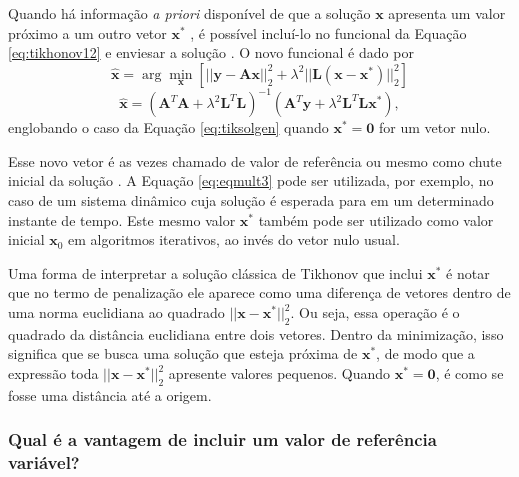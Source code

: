 Quando há informação \textit{a priori} disponível de que a solução $\mathbf{x}$ apresenta um valor próximo a um outro vetor $\mathbf{x}^*$ \cite[pág. 69]{Mueller2012}, é possível incluí-lo no funcional da Equação \eqref{eq:tikhonov12} e enviesar  a solução \cite[pág. 13]{Hansen1998}. O novo funcional é dado por \cite[pág. 33]{paivi}
\begin{equation}
\hat{\mathbf{x}} = \arg\min\limits_{\mathbf{x}} \left[ \vert \vert \mathbf{y}- \mathbf{A} \mathbf{x} \vert \vert^2_2 + \lambda^2 \vert \vert \mathbf{L} \left(\mathbf{x} - \mathbf{x}^*\right) \vert \vert^2_2 \right] 
\label{eq:eqmult33}
\end{equation}
 \begin{equation}
\hat{\mathbf{x}} =  \left( \mathbf{A}^T \mathbf{A} + \lambda^2 \mathbf{L}^T \mathbf{L} \right)^{-1} \left(\mathbf{A}^T \mathbf{y} + \lambda^2 \mathbf{L}^T \mathbf{L} \mathbf{x}^* \right),
\label{eq:eqmult3}
\end{equation}
englobando o caso da Equação \eqref{eq:tiksolgen} quando $\mathbf{x}^* = \mathbf{0}$ for um vetor nulo. 

Esse novo vetor é as vezes chamado de valor de referência  \cite[pág. 60]{Neto2005} ou mesmo como chute inicial da solução \cite[pág. 99]{Camargo2013}.  A Equação \eqref{eq:eqmult3} pode ser utilizada, por exemplo, no caso de um sistema dinâmico cuja solução é esperada para em um determinado instante de tempo. Este mesmo valor $\mathbf{x}^*$ também pode ser utilizado como valor inicial $\mathbf{x}_0$ em algoritmos iterativos, ao invés do vetor nulo usual.

Uma forma de interpretar a solução clássica de Tikhonov que inclui $\mathbf{x}^*$ é notar que no termo de penalização ele aparece como uma diferença de vetores dentro de uma norma euclidiana ao quadrado $\vert\vert\mathbf{x} - \mathbf{x}^*\vert\vert_2^2$. Ou seja, essa operação é o quadrado da distância euclidiana entre dois vetores. Dentro da minimização, isso significa que se busca uma solução que esteja próxima de $\mathbf{x}^*$, de modo que a expressão toda $\vert \vert \mathbf{x} - \mathbf{x}^*\vert \vert^2_2$ apresente valores pequenos. Quando $\mathbf{x}^* = \mathbf{0}$, é como se fosse uma distância até a origem. 

\subsubsection{Qual é a vantagem de incluir um valor de referência variável?}\label{sec:disappearing}


